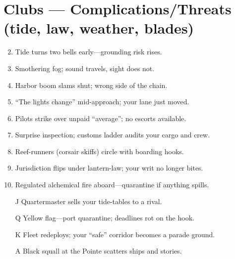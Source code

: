 \section*{Clubs --- Complications/Threats (tide, law, weather, blades)}
\label{sec:kahfagia-complications}
\begin{enumerate}
\setcounter{enumi}{1}
\item Tide turns two bells early---grounding risk rises.
\item Smothering fog; sound travels, sight does not.
\item Harbor boom slams shut; wrong side of the chain.
\item ``The lights change'' mid-approach; your lane just moved.
\item Pilots strike over unpaid ``average''; no escorts available.
\item Surprise inspection; customs ladder audits your cargo and crew.
\item Reef-runners (corsair skiffs) circle with boarding hooks.
\item Jurisdiction flips under lantern-law; your writ no longer bites.
\item Regulated alchemical fire aboard---quarantine if anything spills.
\item[J] Quartermaster sells your tide-tables to a rival.
\item[Q] Yellow flag---port quarantine; deadlines rot on the hook.
\item[K] Fleet redeploys; your ``safe'' corridor becomes a parade ground.
\item[A] Black squall at the Pointe scatters ships and stories.
\end{enumerate}

